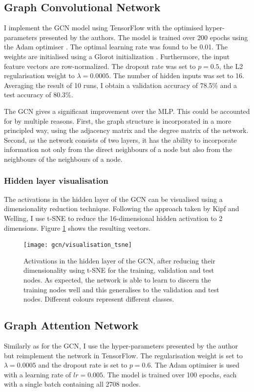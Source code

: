 \documentclass[12pt]{article}
\theoremstyle{definition}
\begin{document}
\subsection{Graph Convolutional Network}

I implement the GCN model using TensorFlow with the optimised hyper-parameters presented by the authors. The model is trained over 200 epochs using the Adam optimiser \cite{kingma2014adam}. The optimal learning rate was found to be 0.01. The weights are initialised using a Glorot initialization \cite{glorot2010understanding}. Furthermore, the input feature vectors are row-normalized. The dropout rate was set to $p=0.5$, the L2 regularisation weight to $\lambda=0.0005$. The number of hidden inputs was set to 16. Averaging the result of 10 runs, I obtain a validation accuracy of 78.5\% and a test accuracy of 80.3\%.

\bigskip

The GCN gives a significant improvement over the MLP. This could be accounted for by multiple reasons. First, the graph structure is incorporated in a more principled way, using the adjacency matrix and the degree matrix of the network. Second, as the network consists of two layers, it has the ability to incorporate information not only from the direct neighbours of a node but also from the neighbours of the neighbours of a node.

\subsubsection{Hidden layer visualisation}

The activations in the hidden layer of the GCN can be visualised using a dimensionality reduction technique. Following the approach taken by Kipf and Welling, I use t-SNE \cite{maaten2008visualizing} to reduce the 16-dimensional hidden activation to 2 dimensions. Figure \ref{fig/gcn_tsne} shows the resulting vectors.

\begin{figure}[h]
	\texttt{[image: gcn/visualisation\_tsne]}
	\centering
	\caption{Activations in the hidden layer of the GCN, after reducing their dimensionality using t-SNE for the training, validation and test nodes. As expected, the network is able to learn to discern the training nodes well and this generalises to the validation and test nodes. Different colours represent different classes.}
	\label{fig/gcn_tsne}
\end{figure}

\subsection{Graph Attention Network}
Similarly as for the GCN, I use the hyper-parameters presented by the author but reimplement the network in TensorFlow. The regularisation weight is set to $\lambda = 0.0005$ and the dropout rate is set to $p=0.6$. The Adam optimiser \cite{kingma2014adam} is used with a learning rate of $\textit{lr} = 0.005$. The model is trained over 100 epochs, each with a single batch containing all 2708 nodes.
\end{document}
